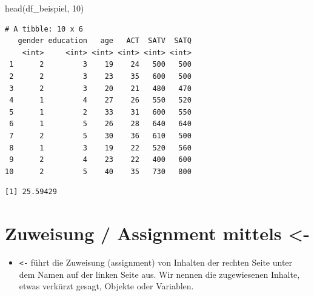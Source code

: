 \documentclass[
  letterpaper,
  DIV=11,
  numbers=noendperiod]{scrreprt}
\newenvironment{Shaded}{\begin{snugshade}}{\end{snugshade}}
\newcommand{\AttributeTok}[1]{\textcolor[rgb]{0.40,0.45,0.13}{#1}}
\newcommand{\ConstantTok}[1]{\textcolor[rgb]{0.56,0.35,0.01}{#1}}
\newcommand{\DecValTok}[1]{\textcolor[rgb]{0.68,0.00,0.00}{#1}}
\newcommand{\FunctionTok}[1]{\textcolor[rgb]{0.28,0.35,0.67}{#1}}
\newcommand{\NormalTok}[1]{\textcolor[rgb]{0.00,0.23,0.31}{#1}}
\newcommand{\OtherTok}[1]{\textcolor[rgb]{0.00,0.23,0.31}{#1}}
\newcommand{\SpecialCharTok}[1]{\textcolor[rgb]{0.37,0.37,0.37}{#1}}
\providecommand{\tightlist}{%
  \setlength{\itemsep}{0pt}\setlength{\parskip}{0pt}}\usepackage{longtable,booktabs,array}
\begin{document}
\begin{Shaded}
\begin{Highlighting}[]
\FunctionTok{head}\NormalTok{(df\_beispiel, }\DecValTok{10}\NormalTok{)}
\end{Highlighting}
\end{Shaded}

\begin{verbatim}
# A tibble: 10 x 6
   gender education   age   ACT  SATV  SATQ
    <int>     <int> <int> <int> <int> <int>
 1      2         3    19    24   500   500
 2      2         3    23    35   600   500
 3      2         3    20    21   480   470
 4      1         4    27    26   550   520
 5      1         2    33    31   600   550
 6      1         5    26    28   640   640
 7      2         5    30    36   610   500
 8      1         3    19    22   520   560
 9      2         4    23    22   400   600
10      2         5    40    35   730   800
\end{verbatim}

\begin{Shaded}
\end{Shaded}

\begin{verbatim}
[1] 25.59429
\end{verbatim}


\chapter{Zuweisung / Assignment mittels
\textless-}\label{zuweisung-assignment-mittels--}

\begin{itemize}
\tightlist
\item
  \texttt{\textless{}-} führt die Zuweisung (assignment) von Inhalten
  der rechten Seite unter dem Namen auf der linken Seite aus. Wir nennen
  die zugewiesenen Inhalte, etwas verkürzt gesagt, Objekte oder
  Variablen.
\end{itemize}

\begin{Shaded}
\end{Shaded}
\end{document}

